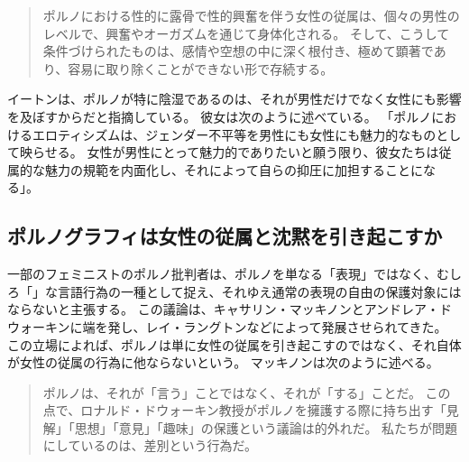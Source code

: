 \documentclass[paper=a4,book,openany]{jlreq}
\newcommand{\ig}[1]{}           %
\begin{document}
\begin{quote}
  ポルノにおける性的に露骨で性的興奮を伴う女性の従属は、個々の男性のレベルで、興奮やオーガズムを通じて身体化される。
そして、こうして条件づけられたものは、感情や空想の中に深く根付き、極めて顕著であり、容易に取り除くことができない形で存続する。
\citep[p.23]{itzin02:_pornog_const_misog}
\end{quote}

イートンは、ポルノが特に陰湿であるのは、それが男性だけでなく女性にも影響を及ぼすからだと指摘している。
彼女は次のように述べている。
「ポルノにおけるエロティシズムは、ジェンダー不平等を男性にも女性にも魅力的なものとして映らせる。
女性が男性にとって魅力的でありたいと願う限り、彼女たちは従属的な魅力の規範を内面化し、それによって自らの抑圧に加担することになる」\citep[p.679]{eaton07:sensibleantiporn}。

\subsection{ポルノグラフィは女性の従属と沈黙を引き起こすか}

一部のフェミニストのポルノ批判者は、ポルノを単なる「表現」ではなく、むしろ「」な言語行為の一種として捉え、それゆえ通常の表現の自由の保護対象にはならないと主張する。
この議論は、キャサリン・マッキノンとアンドレア・ドウォーキン\ig{Andrea Dworkin}に端を発し、レイ・ラングトンなどによって発展させられてきた。
この立場によれば、ポルノは単に女性の従属を引き起こすのではなく、それ自体が女性の従属の行為に他ならないという。
マッキノンは次のように述べる。

\begin{quote}
ポルノは、それが「言う」ことではなく、それが「する」ことだ。
この点で、ロナルド・ドウォーキン\ig{Ronald Dworkin}教授がポルノを擁護する際に持ち出す「見解」「思想」「意見」「趣味」の保護という議論は的外れだ。
私たちが問題にしているのは、差別という行為だ。
\citep{mackinnon94:_pornog}
\end{quote}
\end{document}
